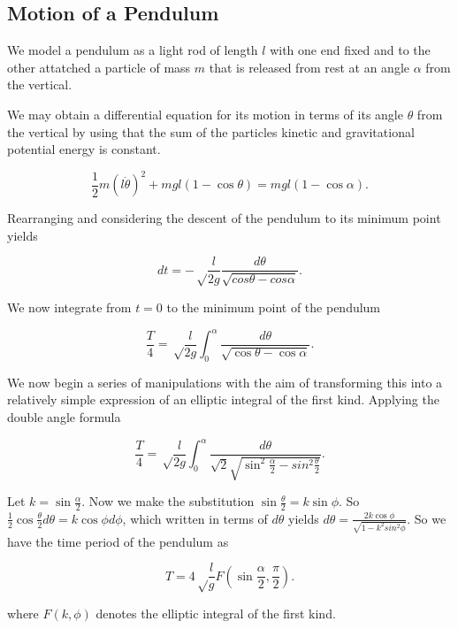 \documentclass[]{article}
\begin{document}
\subsection{Motion of a Pendulum}

\begin{figure}[ht]
    \centering
    \caption{}
    \label{fig:pendulum}
\end{figure}

We model a pendulum as a light rod of length $l$ with one end fixed and to the other attatched a particle of mass $m$ that is released from rest at an angle $\alpha$ from the vertical.

We may obtain a differential equation for its motion in terms of its angle $\theta$ from the vertical by using that the sum of the particles kinetic and gravitational potential energy is constant.

\[
		\frac{1}{2} m (l\dot{\theta})^2 + mgl(1 - \cos{\theta}) = mgl(1 - \cos\alpha)
.\] 

Rearranging and considering the descent of the pendulum to its minimum point yields

\[
		dt = -\sqrt \frac{l}{2g} \frac{d\theta}{\sqrt{cos\theta - cos\alpha}}
.\] 

We now integrate from $t=0$ to the minimum point of the pendulum

\[
		\frac{T}{4} = \sqrt \frac{l}{2g} \int_{0}^\alpha \frac{d\theta}{\sqrt{\cos\theta - \cos\alpha}} 
.\] 

We now begin a series of manipulations with the aim of transforming this into a relatively simple expression of an elliptic integral of the first kind. Applying the double angle formula

\[
		\frac{T}{4} = \sqrt \frac{l}{2g} \int_0^\alpha \frac{d\theta}{\sqrt{2} \sqrt{\sin^2 \frac{\alpha}{2} - sin^2 \frac{\theta}{2}}}
.\] 

Let $k = \sin \frac{\alpha}{2}$. Now we make the substitution $\sin \frac{\theta}{2} = k\sin\phi$. So $\frac{1}{2} \cos \frac{\theta}{2} d\theta = k \cos\phi d\phi$, which written in terms of $d\theta$ yields $d\theta = \frac{2k\cos\phi}{\sqrt{1 - k^2sin^2\phi}}$. So we have the time period of the pendulum as 

\[
		T = 4 \sqrt \frac{l}{g} F\left(\sin \frac{\alpha}{2}, \frac{\pi}{2}\right)
.\]

where $F(k, \phi)$ denotes the elliptic integral of the first kind.
 
\end{document}
